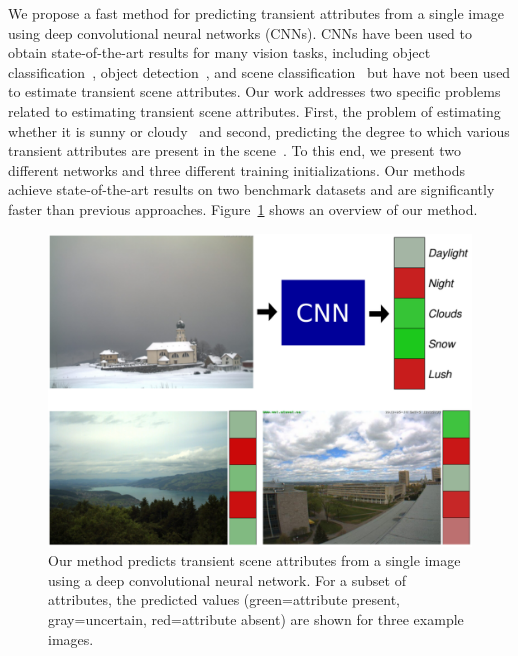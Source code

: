 \documentclass[10pt,twocolumn,letterpaper]{article}
\newcommand{\figref}[1]{Figure~\ref{fig:#1}}
\begin{document}

We propose a fast method for predicting transient attributes from a single
image using deep convolutional neural networks (CNNs). CNNs have been used to
obtain state-of-the-art results for many vision tasks, including object
classification~\cite{krizhevsky2012imagenet}, object
detection~\cite{girshick2013rich}, and scene
classification~\cite{zhou2014places} but have not been used to estimate
transient scene attributes. Our work addresses two specific problems related to
estimating transient scene attributes. First, the problem of estimating whether
it is sunny or cloudy~\cite{lutwoclass} and second, predicting the degree to
which various transient attributes are present in the scene~\cite{Laffont14}.
To this end, we present two different networks and three different training
initializations. Our methods achieve state-of-the-art results on two benchmark
datasets and are significantly faster than previous approaches.
\figref{cartoon} shows an overview of our method.  



\begin{figure}[t]
	\centering
		\includegraphics[width=\linewidth, trim= 0mm 0mm 0mm 0mm]{figs/cartoon.pdf}
    \caption{Our method predicts transient scene attributes from a
      single image using a deep convolutional neural network. For a
      subset of attributes, the predicted values (green=attribute
      present, gray=uncertain, red=attribute absent) are shown for
      three example images. 
    }
		\label{fig:cartoon}
\end{figure}
\end{document}
